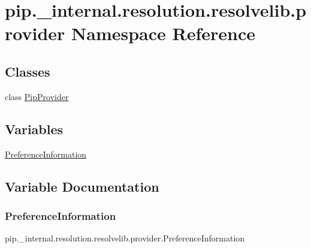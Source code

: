 \hypertarget{namespacepip_1_1__internal_1_1resolution_1_1resolvelib_1_1provider}{}\section{pip.\+\_\+internal.\+resolution.\+resolvelib.\+provider Namespace Reference}
\label{namespacepip_1_1__internal_1_1resolution_1_1resolvelib_1_1provider}
\subsection*{Classes}
\begin{DoxyCompactItemize}
\item 
class \hyperlink{classpip_1_1__internal_1_1resolution_1_1resolvelib_1_1provider_1_1PipProvider}{Pip\+Provider}
\end{DoxyCompactItemize}
\subsection*{Variables}
\begin{DoxyCompactItemize}
\item 
\hyperlink{namespacepip_1_1__internal_1_1resolution_1_1resolvelib_1_1provider_ac943d10f26d9871d3aa1be0bb0ec1271}{Preference\+Information}
\end{DoxyCompactItemize}


\subsection{Variable Documentation}
\mbox{\label{namespacepip_1_1__internal_1_1resolution_1_1resolvelib_1_1provider_ac943d10f26d9871d3aa1be0bb0ec1271}} 
\subsubsection{\texorpdfstring{Preference\+Information}{PreferenceInformation}}
{\footnotesize\ttfamily pip.\+\_\+internal.\+resolution.\+resolvelib.\+provider.\+Preference\+Information}

